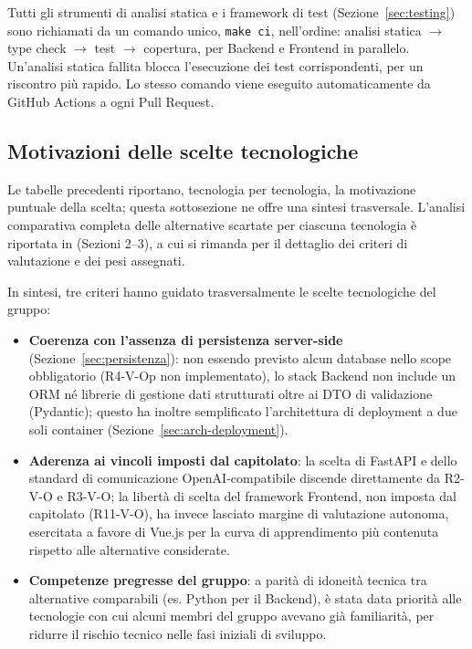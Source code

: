 Tutti gli strumenti di analisi statica e i framework di test (Sezione~\ref{sec:testing}) sono richiamati da un comando unico, \texttt{make ci}, nell'ordine: analisi statica $\rightarrow$ type check $\rightarrow$ test $\rightarrow$ copertura, per Backend e Frontend in parallelo. Un'analisi statica fallita blocca l'esecuzione dei test corrispondenti, per un riscontro più rapido. Lo stesso comando viene eseguito automaticamente da GitHub Actions a ogni Pull Request.

\subsection{Motivazioni delle scelte tecnologiche}
\label{sec:motivazioni-tecnologie}
Le tabelle precedenti riportano, tecnologia per tecnologia, la motivazione puntuale della scelta; questa sottosezione ne offre una sintesi trasversale. L'analisi comparativa completa delle alternative scartate per ciascuna tecnologia è riportata in  (Sezioni 2--3), a cui si rimanda per il dettaglio dei criteri di valutazione e dei pesi assegnati.

In sintesi, tre criteri hanno guidato trasversalmente le scelte tecnologiche del gruppo:

\begin{itemize}
	\item \textbf{Coerenza con l'assenza di persistenza server-side} (Sezione~\ref{sec:persistenza}): non essendo previsto alcun database nello scope obbligatorio (R4-V-Op non implementato), lo stack Backend non include un ORM né librerie di gestione dati strutturati oltre ai DTO di validazione (Pydantic); questo ha inoltre semplificato l'architettura di deployment a due soli container (Sezione~\ref{sec:arch-deployment}).
	\item \textbf{Aderenza ai vincoli imposti dal capitolato}: la scelta di FastAPI e dello standard di comunicazione OpenAI-compatibile discende direttamente da R2-V-O e R3-V-O; la libertà di scelta del framework Frontend, non imposta dal capitolato (R11-V-O), ha invece lasciato margine di valutazione autonoma, esercitata a favore di Vue.js per la curva di apprendimento più contenuta rispetto alle alternative considerate.
	\item \textbf{Competenze pregresse del gruppo}: a parità di idoneità tecnica tra alternative comparabili (es. Python per il Backend), è stata data priorità alle tecnologie con cui alcuni membri del gruppo avevano già familiarità, per ridurre il rischio tecnico nelle fasi iniziali di sviluppo.
\end{itemize}